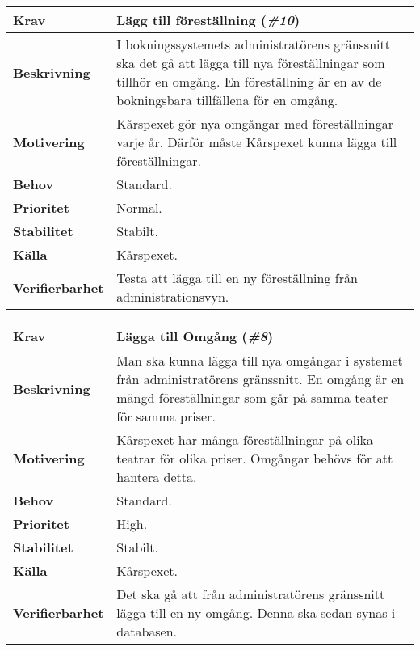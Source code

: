 \documentclass[a4paper, twoside, 11pt, titlepage]{article}
\begin{document}
		\begin{tabular} { p{2.6cm} p{12.5cm} }
			\hline
			\sffamily\textbf{Krav} & Lägg till föreställning (\emph{\#10})  \\
			\hline
			\sffamily\textbf{Beskrivning} & I bokningssystemets administratörens gränssnitt ska det gå att lägga till nya föreställningar som tillhör en omgång. En föreställning är en av de bokningsbara tillfällena för en omgång.  \\
			\hline
			\sffamily\textbf{Motivering} & Kårspexet gör nya omgångar med föreställningar varje år. Därför måste Kårspexet kunna lägga till föreställningar.  \\
			\hline
			\sffamily\textbf{Behov} & Standard.  \\
			\hline
			\sffamily\textbf{Prioritet} & Normal.  \\
			\hline
			\sffamily\textbf{Stabilitet} & Stabilt.  \\
			\hline
			\sffamily\textbf{Källa} & Kårspexet.  \\
			\hline
			\sffamily\textbf{Verifierbarhet} & Testa att lägga till en ny föreställning från administrationsvyn.  \\
			\hline
		\end{tabular}
		\vspace{6mm}

		\begin{tabular} { p{2.6cm} p{12.5cm} }
			\hline
			\sffamily\textbf{Krav} & Lägga till Omgång (\emph{\#8})  \\
			\hline
			\sffamily\textbf{Beskrivning} & Man ska kunna lägga till nya omgångar i systemet från administratörens gränssnitt. En omgång är en mängd föreställningar som går på samma teater för samma priser.  \\
			\hline
			\sffamily\textbf{Motivering} & Kårspexet har många föreställningar på olika teatrar för olika priser. Omgångar behövs för att hantera detta.  \\
			\hline
			\sffamily\textbf{Behov} & Standard.  \\
			\hline
			\sffamily\textbf{Prioritet} & High.  \\
			\hline
			\sffamily\textbf{Stabilitet} & Stabilt.  \\
			\hline
			\sffamily\textbf{Källa} & Kårspexet.  \\
			\hline
			\sffamily\textbf{Verifierbarhet} & Det ska gå att från administratörens gränssnitt lägga till en ny omgång. Denna ska sedan synas i databasen.  \\
			\hline
		\end{tabular}
		\vspace{6mm}
\end{document}
